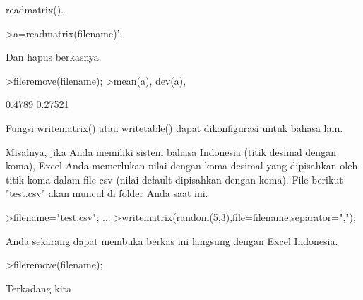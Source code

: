 \documentclass[a4paper,10pt]{article}
\begin{document}
\begin{eulernotebook}
\begin{eulercomment}
\begin{eulercomment}
\begin{eulercomment}
\begin{eulercomment}
\begin{eulercomment}
\begin{eulercomment}
\begin{eulercomment}
\begin{eulercomment}
\begin{eulercomment}
\begin{eulercomment}
\begin{eulercomment}
\begin{eulercomment}
\begin{eulercomment}
\begin{eulercomment}
\begin{eulercomment}
\begin{eulercomment}
\begin{eulercomment}
\begin{eulercomment}
\begin{eulercomment}
\begin{eulercomment}
\begin{eulercomment}
\begin{eulercomment}
\begin{eulercomment}
\begin{eulercomment}
\begin{eulercomment}
\begin{eulercomment}
\begin{eulercomment}
\begin{eulercomment}
\begin{eulercomment}
\begin{eulercomment}
\begin{eulercomment}
\begin{eulercomment}
\begin{eulercomment}
\begin{eulercomment}
\begin{eulercomment}
\begin{eulercomment}
\begin{eulercomment}
\begin{eulercomment}
\begin{eulercomment}
\begin{eulercomment}
\begin{eulercomment}
\begin{eulercomment}
\begin{eulercomment}
\begin{eulercomment}
\begin{eulercomment}
\begin{eulercomment}
\begin{eulercomment}
\begin{eulercomment}
\begin{eulercomment}
\begin{eulercomment}
\begin{eulercomment}
\begin{eulercomment}
\begin{eulercomment}
\begin{eulercomment}
\begin{eulercomment}
\begin{eulercomment}
\begin{eulercomment}
\begin{eulercomment}
\begin{eulercomment}
\begin{eulercomment}
\begin{eulercomment}
\begin{eulercomment}
\begin{eulercomment}
\begin{eulercomment}
\begin{eulercomment}
\begin{eulercomment}
\begin{eulercomment}
\begin{eulercomment}
\begin{eulercomment}
\begin{eulercomment}
\begin{eulercomment}
readmatrix().
\end{eulercomment}
\begin{eulerprompt}
>a=readmatrix(filename)';
\end{eulerprompt}
\begin{eulercomment}
Dan hapus berkasnya.
\end{eulercomment}
\begin{eulerprompt}
>fileremove(filename);
>mean(a), dev(a),
\end{eulerprompt}
\begin{euleroutput}
  0.4789
  0.27521
\end{euleroutput}
\begin{eulercomment}
Fungsi writematrix() atau writetable() dapat dikonfigurasi untuk
bahasa lain.

Misalnya, jika Anda memiliki sistem bahasa Indonesia (titik desimal
dengan koma), Excel Anda memerlukan nilai dengan koma desimal yang
dipisahkan oleh titik koma dalam file csv (nilai default dipisahkan
dengan koma). File berikut "test.csv" akan muncul di folder Anda saat
ini.
\end{eulercomment}
\begin{eulerprompt}
>filename="test.csv"; ...
>writematrix(random(5,3),file=filename,separator=",");
\end{eulerprompt}
\begin{eulercomment}
Anda sekarang dapat membuka berkas ini langsung dengan Excel
Indonesia.
\end{eulercomment}
\begin{eulerprompt}
>fileremove(filename);
\end{eulerprompt}
\begin{eulercomment}
Terkadang kita 
\end{eulercomment}
\end{eulercomment}
\end{eulercomment}
\end{eulercomment}
\end{eulercomment}
\end{eulercomment}
\end{eulercomment}
\end{eulercomment}
\end{eulercomment}
\end{eulercomment}
\end{eulercomment}
\end{eulercomment}
\end{eulercomment}
\end{eulercomment}
\end{eulercomment}
\end{eulercomment}
\end{eulercomment}
\end{eulercomment}
\end{eulercomment}
\end{eulercomment}
\end{eulercomment}
\end{eulercomment}
\end{eulercomment}
\end{eulercomment}
\end{eulercomment}
\end{eulercomment}
\end{eulercomment}
\end{eulercomment}
\end{eulercomment}
\end{eulercomment}
\end{eulercomment}
\end{eulercomment}
\end{eulercomment}
\end{eulercomment}
\end{eulercomment}
\end{eulercomment}
\end{eulercomment}
\end{eulercomment}
\end{eulercomment}
\end{eulercomment}
\end{eulercomment}
\end{eulercomment}
\end{eulercomment}
\end{eulercomment}
\end{eulercomment}
\end{eulercomment}
\end{eulercomment}
\end{eulercomment}
\end{eulercomment}
\end{eulercomment}
\end{eulercomment}
\end{eulercomment}
\end{eulercomment}
\end{eulercomment}
\end{eulercomment}
\end{eulercomment}
\end{eulercomment}
\end{eulercomment}
\end{eulercomment}
\end{eulercomment}
\end{eulercomment}
\end{eulercomment}
\end{eulercomment}
\end{eulercomment}
\end{eulercomment}
\end{eulercomment}
\end{eulercomment}
\end{eulercomment}
\end{eulercomment}
\end{eulercomment}
\end{eulercomment}
\end{eulernotebook}
\end{document}
